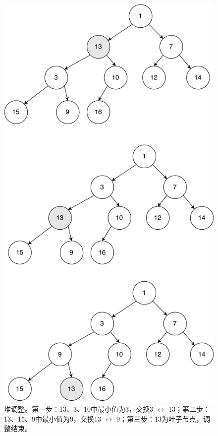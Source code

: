 \documentclass[b5paper]{ctexart}
\begin{document}
\begin{figure}[htbp]
  \centering
  \includegraphics[scale=0.4]{img/heapify}
  \caption{堆调整。第一步：13、3、10中最小值为3，交换3 $\leftrightarrow$ 13；第二步：13、15、9中最小值为9，交换13 $\leftrightarrow$ 9；第三步：13为叶子节点，调整结束。}
  \label{fig:heapify}
\end{figure}
\end{document}
